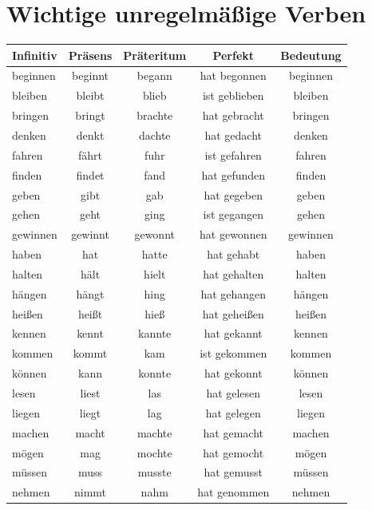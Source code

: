 \section{Wichtige unregelmäßige Verben}
\label{sec:WichtigeUnregelmaessige}

\begin{center}
\begin{tabular}{|l|c|c|c|c|}
\hline
\textbf{Infinitiv} & \textbf{Präsens} & \textbf{Präteritum} & \textbf{Perfekt} & \textbf{Bedeutung} \\ \hline
beginnen & beginnt & begann & hat begonnen & beginnen \\ \hline
bleiben & bleibt & blieb & ist geblieben & bleiben \\ \hline
bringen & bringt & brachte & hat gebracht & bringen \\ \hline
denken & denkt & dachte & hat gedacht & denken \\ \hline
fahren & fährt & fuhr & ist gefahren & fahren \\ \hline
finden & findet & fand & hat gefunden & finden \\ \hline
geben & gibt & gab & hat gegeben & geben \\ \hline
gehen & geht & ging & ist gegangen & gehen \\ \hline
gewinnen & gewinnt & gewonnt & hat gewonnen & gewinnen \\ \hline
haben & hat & hatte & hat gehabt & haben \\ \hline
halten & hält & hielt & hat gehalten & halten \\ \hline
hängen & hängt & hing & hat gehangen & hängen \\ \hline
heißen & heißt & hieß & hat geheißen & heißen \\ \hline
kennen & kennt & kannte & hat gekannt & kennen \\ \hline
kommen & kommt & kam & ist gekommen & kommen \\ \hline
können & kann & konnte & hat gekonnt & können \\ \hline
lesen & liest & las & hat gelesen & lesen \\ \hline
liegen & liegt & lag & hat gelegen & liegen \\ \hline
machen & macht & machte & hat gemacht & machen \\ \hline
mögen & mag & mochte & hat gemocht & mögen \\ \hline
müssen & muss & musste & hat gemusst & müssen \\ \hline
nehmen & nimmt & nahm & hat genommen & nehmen \\ \hline

\end{tabular}
\end{center}
